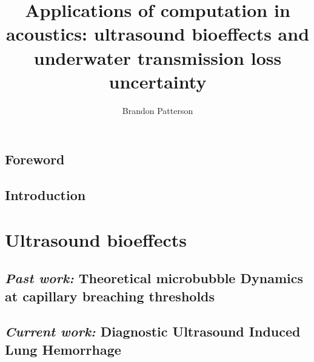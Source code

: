 \documentclass{./tex/thesis-umich}
\title{Applications of computation in acoustics: ultrasound bioeffects and underwater transmission loss uncertainty}
\author{Brandon Patterson}
\begin{document}
\chapter*{Foreword} \label{ch:foreword}



%
\chapter{Introduction} \label{ch:Introduction}

\acresetall

\part{Ultrasound bioeffects} \label{part:ultrasound_bioeffects}


\chapter{\textit{Past work:} Theoretical microbubble Dynamics at capillary breaching thresholds}   \label{ch:usbe_bubble}%
%

% 
\acresetall
%
\chapter{\textit{Current work:} Diagnostic Ultrasound Induced Lung Hemorrhage} \label{ch:usbe_lung}




%



%
\acresetall



%
%
% 
% 
% 
% 
\acresetall
\end{document}
